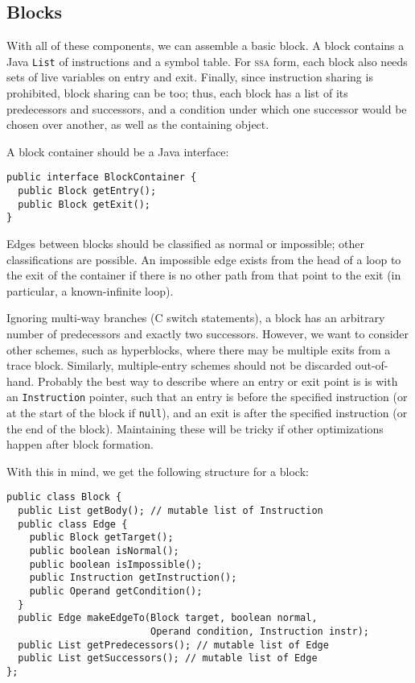 \documentclass[11pt]{article}
\def\class#1{\texttt{#1}}
\def\ssa{\textsc{ssa}}
\begin{document}
\subsection{Blocks}

With all of these components, we can assemble a basic block.  A block
contains a Java \class{List} of instructions and a symbol table.  For
\ssa{} form, each block also needs sets of live variables on entry and
exit.  Finally, since instruction sharing is prohibited, block sharing
can be too; thus, each block has a list of its predecessors and
successors, and a condition under which one successor would be chosen
over another, as well as the containing object.

A block container should be a Java interface:

\begin{verbatim}
public interface BlockContainer {
  public Block getEntry();
  public Block getExit();
}
\end{verbatim}

Edges between blocks should be classified as normal or impossible;
other classifications are possible.  An impossible edge exists from
the head of a loop to the exit of the container if there is no other
path from that point to the exit (in particular, a known-infinite
loop).

Ignoring multi-way branches (C switch statements), a block has an
arbitrary number of predecessors and exactly two successors.  However,
we want to consider other schemes, such as hyperblocks, where there
may be multiple exits from a trace block.  Similarly, multiple-entry
schemes should not be discarded out-of-hand.  Probably the best way to
describe where an entry or exit point is is with an
\class{Instruction} pointer, such that an entry is before the
specified instruction (or at the start of the block if \texttt{null}),
and an exit is after the specified instruction (or the end of the
block).  Maintaining these will be tricky if other optimizations
happen after block formation.

With this in mind, we get the following structure for a block:

\begin{verbatim}
public class Block {
  public List getBody(); // mutable list of Instruction
  public class Edge {
    public Block getTarget();
    public boolean isNormal();
    public boolean isImpossible();
    public Instruction getInstruction();
    public Operand getCondition();
  }
  public Edge makeEdgeTo(Block target, boolean normal,
                         Operand condition, Instruction instr);
  public List getPredecessors(); // mutable list of Edge
  public List getSuccessors(); // mutable list of Edge
};
\end{verbatim}
\end{document}
